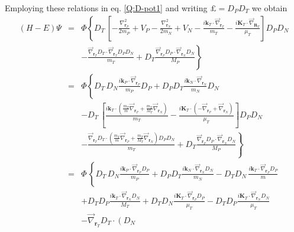 Employing these relations in eq. \ref{Q:D-pot1} and writing $\pounds =
D_{P} D_{T} $ we obtain
%
\begin{eqnarray}\label{Q:D-Pot2}
\left( H - E \right) \Psi \!\!\!&=& \Phi \left\{ D_{T} \, \left[
-\frac{\nabla^{2}_{\bm{r}_{P}}}{2 m_{P}}+ V_{P} -\frac{
\nabla^{2}_{\bm{r}_{N}}}{2 m_{N}} + V_{N} - \frac{i \bm{k}_{T} \cdot
\overrightarrow{\nabla}_{\bm{r}_{T}} }{m_{T}} - \frac{i \bm{K}_{T}
\cdot \overrightarrow{\nabla}_{\bm{R}_{T}}}{\mu_{T}} \right] D_{P}
D_{N}
 \right.
\\
&&- \left. \frac{ \overrightarrow{\nabla}_{\bm{r}_{T}} D_{T} \cdot
\overrightarrow{\nabla}_{\bm{r}_{T}} D_{P} D_{N} }{m_{T}} + D_{T}
\frac{\overrightarrow{\nabla}_{\bm{r}_{P}}D_{P} \cdot
\overrightarrow{\nabla}_{\bm{r}_{N}}D_{N}}{M_{P}} \right\} \nonumber
\\
&=& \Phi \left\{ D_{T} \,  D_{N} \frac{i \bm{k}_{P}\cdot 
\overrightarrow{\nabla}_{\bm{r}_{P}}}{m_{P}}D_{P} +
D_{P}D_{T}\frac{i \bm{k}_{N} \cdot
\overrightarrow{\nabla}_{\bm{r}_{N}}}{m_{N}} D_{N} \right.\nonumber
 \\
&&- D_{T} \,\left[\frac{i \bm{k}_{T} \cdot \left( \frac{m_{T}}{m}
\overrightarrow{\nabla}_{\bm{r}_{P}} + \frac{m_{T}}{M_{T}}
\overrightarrow{\nabla}_{\bm{r}_{N}}\right) }{m_{T}} - \frac{i
\bm{K}_{T} \cdot \left( - \overrightarrow{\nabla}_{\bm{r}_{P}} +
\overrightarrow{\nabla}_{\bm{r}_{N}}\right) }{\mu_{T}} \right]  D_{P}
D_{N}\nonumber
\\
&&- \left. \frac{ \overrightarrow{\nabla}_{\bm{r}_{T}} D_{T} \cdot
\left( \frac{m_{T}}{m} \overrightarrow{\nabla}_{\bm{r}_{P}} +
\frac{m_{T}}{M_{T}} \overrightarrow{\nabla}_{\bm{r}_{N}}\right) D_{P}
D_{N} }{m_{T}} + D_{T} \frac{\overrightarrow{\nabla}_{\bm{r}_{P}}D_{P}
\cdot \overrightarrow{\nabla}_{\bm{r}_{N}}D_{N}}{M_{P}} \right\}
\nonumber
\\
&=& \Phi \, \left\{ D_{T} \,  D_{N} \frac{i \bm{k}_{P}\cdot
\overrightarrow{\nabla}_{\bm{r}_{P}}D_{P}}{m_{P}} +
D_{P}D_{T}\frac{i \bm{k}_{N} \cdot
\overrightarrow{\nabla}_{\bm{r}_{N}} D_{N}}{m_{N}} - D_{T} D_{N} \,
\frac{i \bm{k}_{T} \cdot \overrightarrow{\nabla}_{\bm{r}_{P}}
D_{P}}{m} \right. \nonumber
 \\
&&+ D_{T} D_{P} \frac{i \bm{k}_{T} \cdot
\overrightarrow{\nabla}_{\bm{r}_{N}} D_{N}}{M_{T}} + D_{T} D_{N}
\frac{i \bm{K}_{T} \cdot \overrightarrow{\nabla}_{\bm{r}_{P}}
D_{P}}{\mu_{T}} - D_{T} D_{P} \frac{i \bm{K}_{T} \cdot
\overrightarrow{\nabla}_{\bm{r}_{N}} D_{N}}{\mu_{T}} \nonumber
\\
&&- \left. \overrightarrow{\nabla}_{\bm{r}_{T}} D_{T} \cdot \left(D_{N}

\end{eqnarray}
